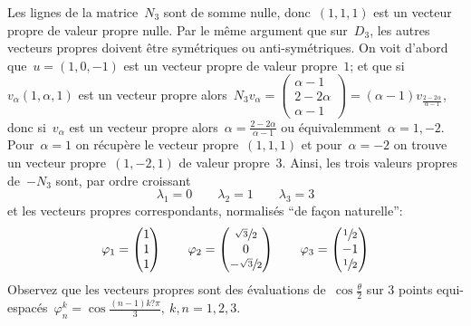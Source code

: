 \documentclass[a4paper,11pt]{article}
\begin{document}
\clearpage


Les lignes de la matrice~$N_3$ sont de somme nulle, donc~$(1,1,1)$ est un
vecteur propre de valeur propre nulle.  Par le même argument que sur~$D_3$, les
autres vecteurs propres doivent être symétriques ou anti-symétriques.  On voit
d'abord que~$u=(1,0,-1)$ est un vecteur propre de valeur propre~$1$; et que
si~$v_\alpha(1,\alpha,1)$ est un vecteur propre alors~$N_3v_\alpha=
\left(\begin{smallmatrix}\alpha-1\\2-2\alpha\\\alpha-1\end{smallmatrix}\right)=(\alpha-1)v_{\frac{2-2\alpha}{\alpha-1}}$,
donc si~$v_\alpha$ est un vecteur propre
alors~$\alpha=\frac{2-2\alpha}{\alpha-1}$ ou équivalemment~$\alpha=1,-2$.
Pour~$\alpha=1$ on récupère le vecteur propre~$(1,1,1)$ et pour~$\alpha=-2$ on
trouve un vecteur propre~$(1,-2,1)$ de valeur propre~$3$.
Ainsi, les trois valeurs
propres de~$-N_3$ sont, par ordre croissant
\[
	\lambda_1 = 0
	\qquad
	\lambda_2 = 1
	\qquad
	\lambda_3 = 3
\]
et les vecteurs propres correspondants, normalisés ``de façon naturelle'':
\[
	\varphi_1=\begin{pmatrix}
		1\\
		1\\
		1
	\end{pmatrix}
	\qquad
	\varphi_2=\begin{pmatrix}
		\sfrac{\sqrt3}2\\
		0\\
		-\sfrac{\sqrt3}2
	\end{pmatrix}
	\qquad
	\varphi_3=\begin{pmatrix}
		\sfrac12\\
		-1\\
		\sfrac12\\
	\end{pmatrix}
\]
Observez que les vecteurs propres sont des évaluations de~$\cos\tfrac\theta2$
sur 3 points equi-espacés~$\varphi_n^k=\cos\frac{(n-1)k?\pi}3,\ k,\!n=1,2,3$.
\end{document}
